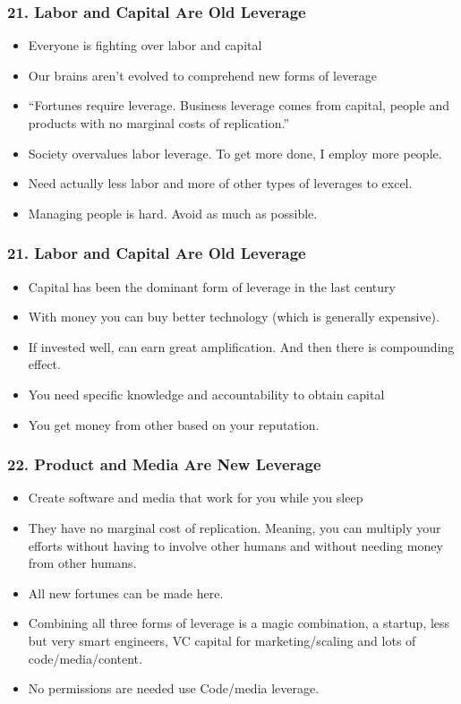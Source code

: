 \begin{frame}[fragile]
\frametitle{21. Labor and Capital Are Old Leverage}
\begin{itemize}
\item Everyone is fighting over labor and capital
\item Our brains aren't evolved to comprehend new forms of leverage
\item ``Fortunes require leverage. Business leverage comes from capital, people and products with no marginal costs of replication.''
\item Society overvalues labor leverage. To get more done, I employ more people.
\item Need actually less labor and more of other types of leverages to excel.
\item Managing people is hard. Avoid as much as possible.

\end{itemize}
\end{frame}

\begin{frame}[fragile]
\frametitle{21. Labor and Capital Are Old Leverage}
\begin{itemize}
\item Capital has been the dominant form of leverage in the last century
\item With money you can buy better technology (which is generally expensive).
\item If invested well, can earn great amplification. And then there is compounding effect.
\item You need specific knowledge and accountability to obtain capital
\item You get money from other based on your reputation.

\end{itemize}
\end{frame}

\begin{frame}[fragile]
\frametitle{22. Product and Media Are New Leverage}
\begin{itemize}
\item Create software and media that work for you while you sleep
\item They have no marginal cost of replication. Meaning, you can multiply your efforts without having to involve other humans and without needing money from other humans.
\item All new fortunes can be made here.
\item Combining all three forms of leverage is a magic combination, a startup, less but very smart engineers, VC capital for marketing/scaling and lots of code/media/content.
\item No permissions are needed use Code/media leverage.
\end{itemize}
\end{frame}

